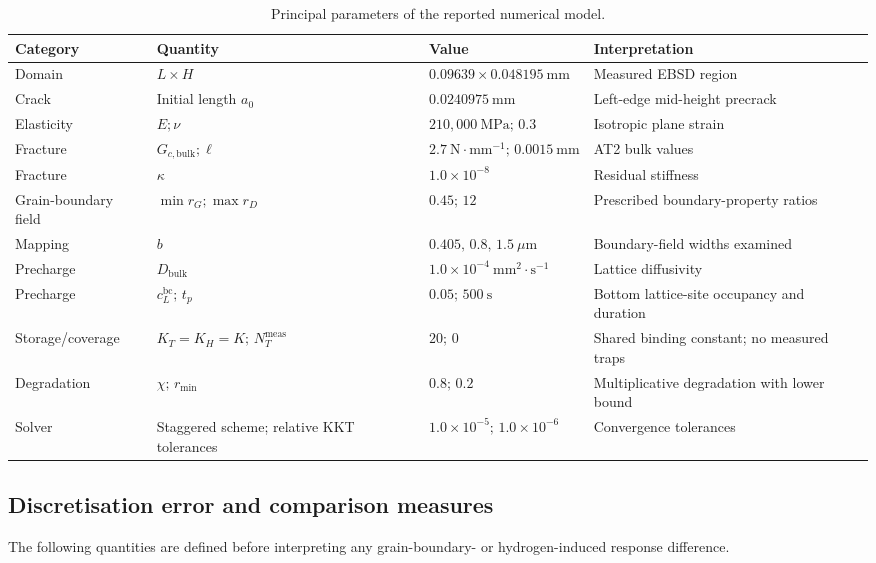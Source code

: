 \documentclass[preprint,12pt]{elsarticle}
\begin{document}
\begin{table}[t]
\centering
\caption{Principal parameters of the reported numerical model.}
\label{tab:1}
\scriptsize
\setlength{\tabcolsep}{4pt}
\begin{tabularx}{\textwidth}{>{\raggedright\arraybackslash}p{}XXX}
\toprule
\textbf{Category} & \textbf{Quantity} & \textbf{Value} & \textbf{Interpretation} \\
\midrule
Domain & \(L\times H\) & \(0.09639\times0.048195~\mathrm{mm}\) & Measured EBSD region \\
Crack & Initial length \(a_0\) & \(0.0240975~\mathrm{mm}\) & Left-edge mid-height precrack \\
Elasticity & \(E;\nu\) & \(210{,}000~\mathrm{MPa};\,0.3\) & Isotropic plane strain \\
Fracture & \(G_{c,\mathrm{bulk}};\ell\) & \(2.7~\mathrm{N}\!\cdot\!\mathrm{mm}^{-1};\,0.0015~\mathrm{mm}\) & AT2 bulk values \\
Fracture & \(\kappa\) & \(1.0\times10^{-8}\) & Residual stiffness \\
Grain-boundary field & \(\min r_G;\max r_D\) & \(0.45;\,12\) & Prescribed boundary-property ratios \\
Mapping & \(b\) & \(0.405,\,0.8,\,1.5~\mu\mathrm{m}\) & Boundary-field widths examined \\
Precharge & \(D_{\mathrm{bulk}}\) & \(1.0\times10^{-4}~\mathrm{mm}^{2}\!\cdot\!\mathrm{s}^{-1}\) & Lattice diffusivity \\
Precharge & \(c_L^{\mathrm{bc}};\,t_p\) & \(0.05;\,500~\mathrm{s}\) & Bottom lattice-site occupancy and duration \\
Storage/coverage & \(K_T=K_H=K;\,N_T^{\mathrm{meas}}\) & \(20;\,0\) & Shared binding constant; no measured traps \\
Degradation & \(\chi;\,r_{\min}\) & \(0.8;\,0.2\) & Multiplicative degradation with lower bound \\
Solver & Staggered scheme; relative KKT tolerances & \(1.0\times10^{-5};\,1.0\times10^{-6}\) & Convergence tolerances \\
\bottomrule
\end{tabularx}
\end{table}

\subsection{Discretisation error and comparison measures}
The following quantities are defined before interpreting any grain-boundary- or
hydrogen-induced response difference.
\end{document}
